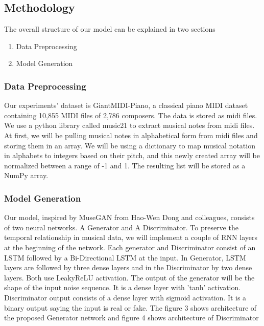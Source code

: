 \documentclass[letterpaper]{article}
\begin{document}
\subsection{Methodology}
The overall structure of our model can be explained in two sections
\begin{enumerate}
    \item Data Preprocessing
    \item Model Generation
\end{enumerate}

\subsubsection{Data Preprocessing}
Our experiments' dataset is GiantMIDI-Piano, a classical piano MIDI dataset containing 10,855 MIDI files of 2,786 composers. The data is stored as midi files. We use a python library called music21 to extract musical notes from midi files. At first, we will be pulling musical notes in alphabetical form from midi files and storing them in an array. We will be using a dictionary to map musical notation in alphabets to integers based on their pitch, and this newly created array will be normalized between a range of -1 and 1. The resulting list will be stored as a NumPy array.

\subsubsection{Model Generation}

Our model, inspired by MuseGAN from Hao-Wen Dong and colleagues, consists of two neural networks. A Generator and A Discriminator. To preserve the temporal relationship in musical data, we will implement a couple of RNN layers at the beginning of the network. Each generator and Discriminator consist of an LSTM followed by a Bi-Directional LSTM at the input. In Generator, LSTM layers are followed by three dense layers and in the Discriminator by two dense layers. Both use LeakyReLU activation. The output of the generator will be the shape of the input noise sequence. It is a dense layer with 'tanh' activation. Discriminator output consists of a dense layer with sigmoid activation. It is a binary output saying the input is real or fake. The figure 3 shows architecture of the proposed Generator network and figure 4 shows architecture of Discriminator
\end{document}
